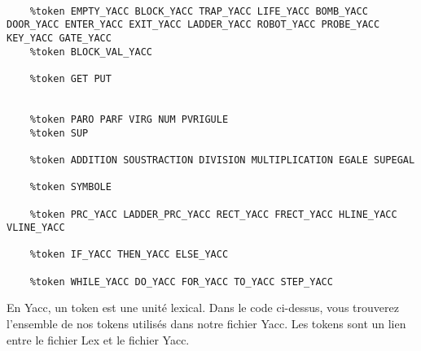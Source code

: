 \lstset{style=mystyle}
\begin{lstlisting}[caption=Token Yacc]
    %token LEVEL END

    %token EMPTY_YACC BLOCK_YACC TRAP_YACC LIFE_YACC BOMB_YACC DOOR_YACC ENTER_YACC EXIT_YACC LADDER_YACC ROBOT_YACC PROBE_YACC KEY_YACC GATE_YACC
    %token BLOCK_VAL_YACC

    %token GET PUT


    %token PARO PARF VIRG NUM PVRIGULE
    %token SUP

    %token ADDITION SOUSTRACTION DIVISION MULTIPLICATION EGALE SUPEGAL

    %token SYMBOLE

    %token PRC_YACC LADDER_PRC_YACC RECT_YACC FRECT_YACC HLINE_YACC VLINE_YACC 

    %token IF_YACC THEN_YACC ELSE_YACC

    %token WHILE_YACC DO_YACC FOR_YACC TO_YACC STEP_YACC

\end{lstlisting}

En Yacc, un token est une unité lexical. Dans le code ci-dessus, vous trouverez l'ensemble de nos tokens utilisés dans notre fichier Yacc.
Les tokens sont un lien entre le fichier Lex et le fichier Yacc.

\newpage